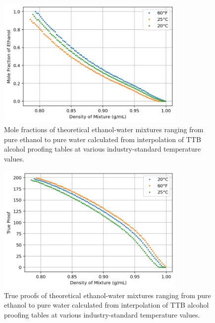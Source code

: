 \documentclass[lettersize,journal]{IEEEtran}
\begin{document}
	\begin{figure}[!t]
		\centering
		\includegraphics[width=3.6in]{fig1}
		\caption{ Mole fractions of theoretical ethanol-water mixtures ranging from pure ethanol to pure water calculated from interpolation of TTB alcohol proofing tables at various industry-standard temperature values. }
		\label{fig_1}
	\end{figure}
	\begin{figure}[!t]
		\centering
		\includegraphics[width=3.6in]{fig2}
		\caption{{ True proofs of theoretical ethanol-water mixtures ranging from pure ethanol to pure water calculated from interpolation of TTB alcohol proofing tables at various industry-standard temperature values. } }
		\label{fig_2}
	\end{figure}
\end{document}
